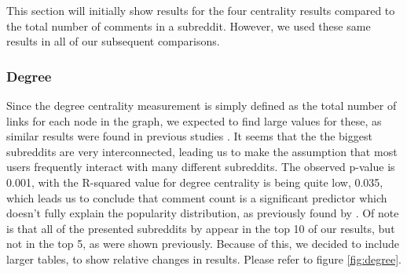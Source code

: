 \documentclass[bsc,frontabs,twoside,singlespacing,parskip,deptreport]{infthesis}
\begin{document}
This section will initially show results for the four centrality results compared to the total number of comments in a subreddit. However, we used these same results in all of our subsequent comparisons.

\subsubsection{Degree}

Since the degree centrality measurement is simply defined as the total number of links for each node in the graph, we expected to find large values for these,  as similar results were found in previous studies \cite{steinbauer}. It seems that the the biggest subreddits are very interconnected, leading us to make the assumption that most users frequently interact with many different subreddits. The observed p-value is 0.001, with the R-squared value for degree centrality is being quite low, 0.035, which leads us to conclude that comment count is a significant predictor which doesn't fully explain the popularity distribution, as previously found by \cite{masters}. Of note is that all of the presented subreddits by \cite{masters} appear in the top 10 of our results, but not in the top 5, as were shown previously. Because of this, we decided to include larger tables, to show relative changes in results. Please refer to figure \ref{fig:degree}.

\begin{table}[!h]
\centering
{}
\caption{Top 10 subreddits ordered by their degree score}
\label{top-degree}
\end{table}
\end{document}
